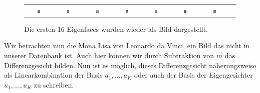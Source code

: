 \begin{figure}[ht]
\begin{tabular}{cccccccc}
		\includegraphics[width=0.1\textwidth]{images/eigenfaces/eigenface09} & \includegraphics[width=0.1\textwidth]{images/eigenfaces/eigenface10} &
		\includegraphics[width=0.1\textwidth]{images/eigenfaces/eigenface11} & \includegraphics[width=0.1\textwidth]{images/eigenfaces/eigenface12} &
		\includegraphics[width=0.1\textwidth]{images/eigenfaces/eigenface13} & \includegraphics[width=0.1\textwidth]{images/eigenfaces/eigenface14} &
		\includegraphics[width=0.1\textwidth]{images/eigenfaces/eigenface15} \\
	\end{tabular}
	\caption{Die ersten 16 Eigenfaces wurden wieder als Bild dargestellt.}
	\label{fig:eigenfaces}
\end{figure}
Wir betrachten nun die Mona Lisa von Leonardo da Vinci, ein Bild das nicht in unserer Datenbank ist.
Auch hier können wir durch Subtraktion von $\vec m$ das Differenzgesicht bilden.
Nun ist es möglich, dieses Differenzgesicht näherungsweise als Linearkombination der Basis $a_1,\ldots,a_K$ oder auch der Basis der Eigengesichter $u_1,\ldots,u_K$ zu schreiben.
